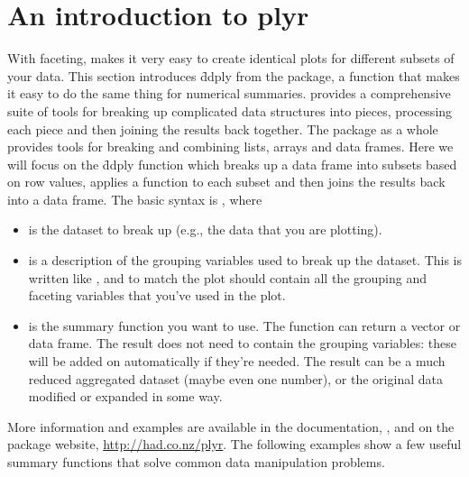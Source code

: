 \section{An introduction to plyr}
\label{sec:plyr}

With faceting, \ggplot makes it very easy to create identical plots for different subsets of your data. This section introduces \f{ddply} from the  package, a function that makes it easy to do the same thing for numerical summaries.  provides a comprehensive suite of tools for breaking up complicated data structures into pieces, processing each piece and then joining the results back together. The  package as a whole provides tools for breaking and combining lists, arrays and data frames. Here we will focus on the \f{ddply} function which breaks up a data frame into subsets based on row values, applies a function to each subset and then joins the results back into a data frame. The basic syntax is , where

\begin{itemize}

  \item {} is the dataset to break up (e.g., the data that you are plotting).

  \item {} is a description of the grouping variables used to break up the dataset. This is written like , and to match the plot should contain all the grouping and faceting variables that you've used in the plot.

  \item {} is the summary function you want to use. The function can return a vector or data frame. The result does not need to contain the grouping variables: these will be added on automatically if they're needed. The result can be a much reduced aggregated dataset (maybe even one number), or the original data modified or expanded in some way.

\end{itemize}

More information and examples are available in the documentation, , and on the package website, \url{http://had.co.nz/plyr}.  The following examples show a few useful summary functions that solve common data manipulation problems.

